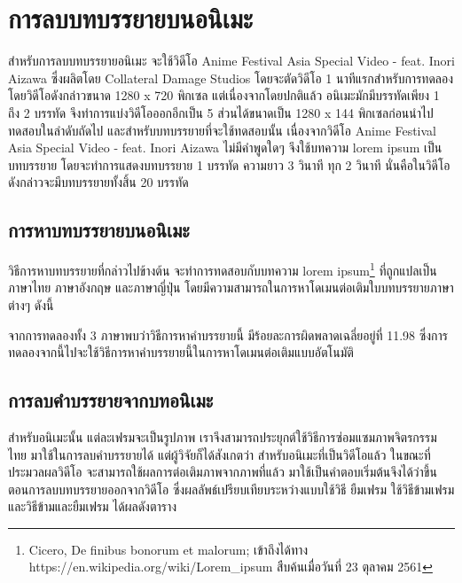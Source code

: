 \section{การลบบทบรรยายบนอนิเมะ}
\hspace{1cm} สำหรับการลบบทบรรยายอนิเมะ จะใช้วิดีโอ Anime Festival Asia Special Video - feat. Inori Aizawa ซึ่งผลิตโดย Collateral Damage Studios โดยจะตัดวิดีโอ 1 นาทีแรกสำหรับการทดลอง โดยวิดีโอดังกล่าวขนาด 1280 x 720 พิกเซล แต่เนื่องจากโดยปกติแล้ว อนิเมะมักมีบรรทัดเพียง 1 ถึง 2 บรรทัด จึงทำการแบ่งวิดีโอออกอีกเป็น 5 ส่วนได้ขนาดเป็น 1280 x 144 พิกเซลก่อนนำไปทดสอบในลำดับถัดไป
\hspace{1cm} และสำหรับบทบรรยายที่จะใช้ทดสอบนั้น เนื่องจากวิดีโอ Anime Festival Asia Special Video - feat. Inori Aizawa ไม่มีคำพูดใดๆ จึงใช้บทความ lorem ipsum เป็นบทบรรยาย โดยจะทำการแสดงบทบรรยาย 1 บรรทัด ความยาว 3 วินาที ทุก 2 วินาที นั่นคือในวิดีโอดังกล่าวจะมีบทบรรยายทั้งสิ้น 20 บรรทัด	
	


\subsection{การหาบทบรรยายบนอนิเมะ}	
    
\hspace{1cm} วิธีการหาบทบรรยายที่กล่าวไปข้างต้น จะทำการทดสอบกับบทความ lorem ipsum\footnote{Cicero, De finibus bonorum et malorum; เข้าถึงได้ทาง https://en.wikipedia.org/wiki/Lorem\_ipsum สืบค้นเมื่อวันที่ 23 ตุลาคม 2561} ที่ถูกแปลเป็นภาษาไทย ภาษาอังกฤษ และภาษาญี่ปุ่น โดยมีความสามารถในการหาโดเมนต่อเติมใบบทบรรยายภาษาต่างๆ ดังนี้


	

\hspace{1cm} จากการทดลองทั้ง  3 ภาษาพบว่าวิธีการหาคำบรรยายนี้ มีร้อยละการผิดพลาดเฉลี่ยอยู่ที่ 11.98 ซึ่งการทดลองจากนี้ไปจะใช้วิธีการหาคำบรรยายนี้ในการหาโดเมนต่อเติมแบบอัตโนมัติ

\subsection{การลบคำบรรยายจากบทอนิเมะ}

\hspace{1cm} สำหรับอนิเมะนั้น แต่ละเฟรมจะเป็นรูปภาพ เราจึงสามารถประยุกต์ใช้วิธีการซ่อมแซมภาพจิตรกรรมไทย มาใช้ในการลบคำบรรยายได้ แต่ผู้วิจัยก็ได้สังเกตว่า สำหรับอนิเมะที่เป็นวิดีโอแล้ว ในขณะที่ประมวลผลวิดีโอ จะสามารถใช้ผลการต่อเติมภาพจากภาพที่แล้ว มาใช้เป็นคำตอบเริ่มต้นจึงได้ว่าขึ้นตอนการลบบทบรรยายออกจากวิดีโอ ซึ่งผลลัพธ์เปรียบเทียบระหว่างแบบใช้วิธี ยืมเฟรม ใช้วิธีข้ามเฟรม และวิธีข้ามและยืมเฟรม ได้ผลดังตาราง

